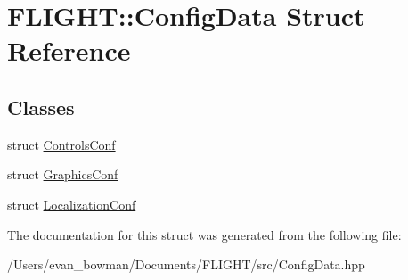 \hypertarget{struct_f_l_i_g_h_t_1_1_config_data}{}\section{F\+L\+I\+G\+HT\+:\+:Config\+Data Struct Reference}
\label{struct_f_l_i_g_h_t_1_1_config_data}
\subsection*{Classes}
\begin{DoxyCompactItemize}
\item 
struct \hyperlink{struct_f_l_i_g_h_t_1_1_config_data_1_1_controls_conf}{Controls\+Conf}
\item 
struct \hyperlink{struct_f_l_i_g_h_t_1_1_config_data_1_1_graphics_conf}{Graphics\+Conf}
\item 
struct \hyperlink{struct_f_l_i_g_h_t_1_1_config_data_1_1_localization_conf}{Localization\+Conf}
\end{DoxyCompactItemize}


The documentation for this struct was generated from the following file\+:\begin{DoxyCompactItemize}
\item 
/\+Users/evan\+\_\+bowman/\+Documents/\+F\+L\+I\+G\+H\+T/src/Config\+Data.\+hpp\end{DoxyCompactItemize}
